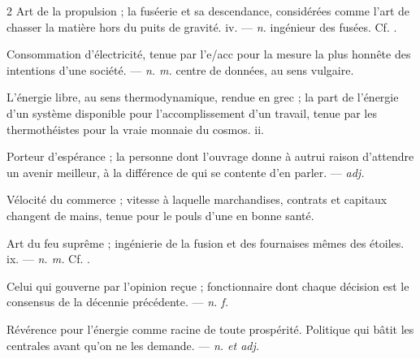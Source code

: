 \begin{multicols}{2}
 Art de la propulsion ; la fuséerie et sa descendance, considérées comme l'art de chasser la matière hors du puits de gravité.   iv. —  \textit{n.} ingénieur des fusées. Cf. .

 Consommation d'électricité, tenue par l'e/acc pour la mesure la plus honnête des intentions d'une société. —  \textit{n. m.} centre de données, au sens vulgaire.

 L'énergie libre, au sens thermodynamique, rendue en grec ; la part de l'énergie d'un système disponible pour l'accomplissement d'un travail, tenue par les thermothéistes pour la vraie monnaie du cosmos.   ii.

 Porteur d'espérance ; la personne dont l'ouvrage donne à autrui raison d'attendre un avenir meilleur, à la différence de qui se contente d'en parler. —  \textit{adj.}

 Vélocité du commerce ; vitesse à laquelle marchandises, contrats et capitaux changent de mains, tenue pour le pouls d'une  en bonne santé.

 Art du feu suprême ; ingénierie de la fusion et des fournaises mêmes des étoiles.   ix. —  \textit{n. m.} Cf. .

 Celui qui gouverne par l'opinion reçue ; fonctionnaire dont chaque décision est le consensus de la décennie précédente. —  \textit{n. f.}

  Révérence pour l'énergie comme racine de toute prospérité.  Politique qui bâtit les centrales avant qu'on ne les demande. —  \textit{n. et adj.}


\end{multicols}
